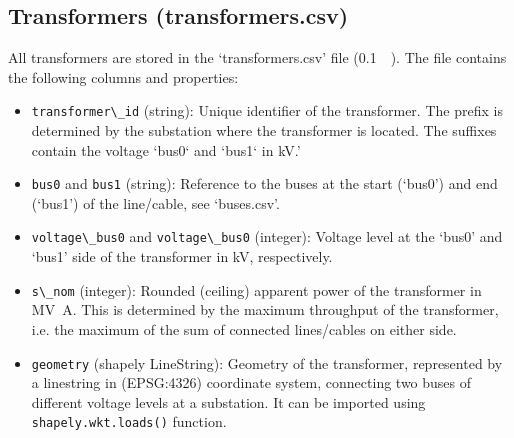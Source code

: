 \documentclass[fleqn,10pt]{wlscirep}
\newcommand{\colorcode}[1]{\colorbox{gray!20}{\lstinline|#1|}}
\begin{document}
\subsection*{Transformers (transformers.csv)}
All transformers are stored in the `transformers.csv' file (\SI{0.1}{\mega\byte}). The file contains the following columns and properties:
\begin{itemize}
    \item \colorcode{transformer\_id} (string): Unique identifier of the transformer. The prefix is determined by the substation where the transformer is located. The suffixes contain the voltage `bus0` and `bus1` in \si{\kilo\volt}.'
    \item \colorcode{bus0} and \colorcode{bus1} (string): Reference to the buses at the start (`bus0') and end (`bus1') of the line/cable, see `buses.csv'.
    \item \colorcode{voltage\_bus0} and \colorcode{voltage\_bus0} (integer): Voltage level at the `bus0' and `bus1' side of the transformer in \si{\kilo\volt}, respectively.
    \item \colorcode{s\_nom} (integer): Rounded (ceiling) apparent power of the transformer in \si{\mega\volt\ampere}. This is determined by the maximum throughput of the transformer, i.e. the maximum of the sum of connected lines/cables on either side.
    \item \colorcode{geometry} (shapely LineString): Geometry of the transformer, represented by a linestring in (EPSG:4326) coordinate system, connecting two buses of different voltage levels at a substation. It can be imported using \colorcode{shapely.wkt.loads()} function.
\end{itemize}
\end{document}
